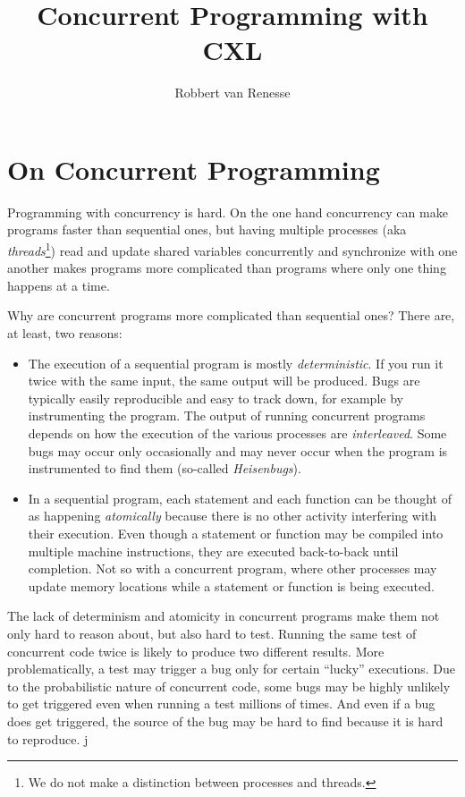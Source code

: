 \documentclass{report}
\title{Concurrent Programming with CXL}
\author{Robbert van Renesse}
\begin{document}
\maketitle
\tableofcontents

\chapter{On Concurrent Programming}

Programming with concurrency is hard.  On the one hand concurrency
can make programs faster than sequential ones, but having multiple
processes (aka \emph{threads}\footnote{We
do not make a distinction between processes and threads.})
read and update shared variables
concurrently and synchronize with one another makes programs more
complicated than programs where only one thing happens at a time.


Why are concurrent
programs more complicated than sequential ones?
There are, at least, two reasons:
\begin{itemize}
\item The execution of a sequential
program is mostly \emph{deterministic}.
If you run it twice with the same input, the same output will be produced.
Bugs are typically easily reproducible and easy to track down, for example
by instrumenting the program.
The output of running concurrent programs depends on how the
execution of the various processes are \emph{interleaved}.
Some bugs may occur only occasionally and
may never occur when the program is instrumented to find them
(so-called \emph{Heisenbugs}).
\item In a sequential program, each statement and each function can be
thought of as happening \emph{atomically}
because there is no other activity interfering with their execution.
Even though a statement or function may
be compiled into multiple machine instructions, they are executed back-to-back
until completion.  Not so with a concurrent program, where other processes
may update memory locations while a statement or function is being executed.
\end{itemize}
The lack of determinism and atomicity in concurrent programs make them
not only hard to reason about, but also hard to test.
Running the same test of concurrent code twice is likely to produce
two different results.  More problematically, a test may trigger a
bug only for certain ``lucky'' executions.  Due to the probabilistic
nature of concurrent code, some bugs may be highly unlikely to get
triggered even when running a test millions of times.  And even if
a bug does get triggered, the source of the bug may be hard to find
because it is hard to reproduce.
j
\end{document}
